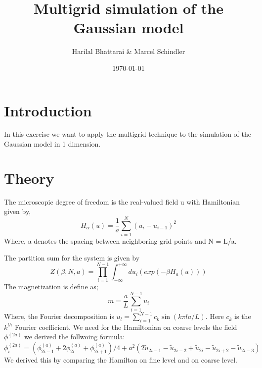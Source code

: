 \documentclass[11pt, a4paper, DIV=12]{scrartcl}
\title{ Multigrid simulation of the Gaussian model}
\date{\today}
\author{Harilal Bhattarai \& Marcel Schindler}
\begin{document}
	\maketitle
	
\section{Introduction}
In this exercise we want to apply the multigrid technique to the simulation of the Gaussian model in 1 dimension.
\section{Theory}
The microscopic degree of freedom is the real-valued field u with Hamiltonian given by,
\begin{equation}
	H_{\alpha}(u)=\frac{1}{a} \sum_{i=1}^{N}(u_{i}-u_{i-1})^{2}
\end{equation}
Where, a denotes the spacing between neighboring grid points and N = L/a.

The partition sum for the system is given by
\begin{equation}
	Z(\beta, N, a)= \prod_{i=1}^{N-1}\int_{- \infty}^{+ \infty}du_{i}(exp (-\beta H_{a}(u)))
\end{equation}
The magnetization is define as;
\begin{equation}
	m=\frac{a}{L}\sum_{i=1}^{N-1}u_{i}
	\label{equ:magnetization}
\end{equation} 
Where, the Fourier decomposition is $u_{l}=\sum_{i=1}^{N-1}c_{k} \sin(k\pi la/L)  $. Here $ c_{k} $ is the $ k^{th} $ Fourier coefficient.
 We need for the Hamiltonian on coarse levels the field $\phi^{(2a)}$ we derived the follwoing formula:
\begin{equation}
\phi^{(2a)}_i=(\phi^{(a)}_{2i-1}+2\phi^{(a)}_{2i}+\phi^{(a)}_{2i+1})/4+a^2(2\tilde{u}_{2i-1}-\tilde{u}_{2i-2}+\tilde{u}_{2i}-\tilde{u}_{2i+2}-\tilde{u}_{2i-3})
\end{equation}
We derived this by comparing the Hamilton on fine level and on coarse level.
\end{document}
